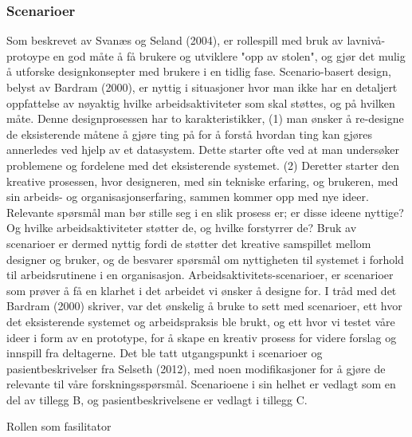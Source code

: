 \subsubsection{Scenarioer}
Som beskrevet av Svanæs og Seland (2004), er rollespill med bruk av lavnivå-protoype en god måte å få brukere og utviklere "opp av stolen", og gjør det mulig å utforske designkonsepter med brukere i en tidlig fase. Scenario-basert design, belyst av Bardram (2000), er nyttig i situasjoner hvor man ikke har en detaljert oppfattelse av nøyaktig hvilke arbeidsaktiviteter som skal støttes, og på hvilken måte. Denne designprosessen har to karakteristikker, (1) man ønsker å re-designe de eksisterende måtene å gjøre ting på for å forstå hvordan ting kan gjøres annerledes ved hjelp av et datasystem. Dette starter ofte ved at man undersøker problemene og fordelene med det eksisterende systemet. (2) Deretter starter den kreative prosessen, hvor designeren, med sin tekniske erfaring, og brukeren, med sin arbeids- og organisasjonserfaring, sammen kommer opp med nye ideer. Relevante spørsmål man bør stille seg i en slik prosess er; er disse ideene nyttige? Og hvilke arbeidsaktiviteter støtter de, og hvilke forstyrrer de? Bruk av scenarioer er dermed nyttig fordi de støtter det kreative samspillet mellom designer og bruker, og de besvarer spørsmål om nyttigheten til systemet i forhold til arbeidsrutinene i en organisasjon. Arbeidsaktivitets-scenarioer, er scenarioer som prøver å få en klarhet i det arbeidet vi ønsker å designe for. 
I tråd med det Bardram (2000) skriver, var det ønskelig å bruke to sett med scenarioer, ett hvor det eksisterende systemet og arbeidspraksis ble brukt, og ett hvor vi testet våre ideer i form av en prototype, for å skape en kreativ prosess for videre forslag og innspill fra deltagerne. Det ble tatt utgangspunkt i scenarioer og pasientbeskrivelser fra Selseth (2012)\nocite{Selseth12}, med noen modifikasjoner for å gjøre de relevante til våre forskningsspørsmål. Scenarioene i sin helhet er vedlagt som en del av tillegg B, og pasientbeskrivelsene er vedlagt i tillegg C.

\noindent
Rollen som fasilitator 

